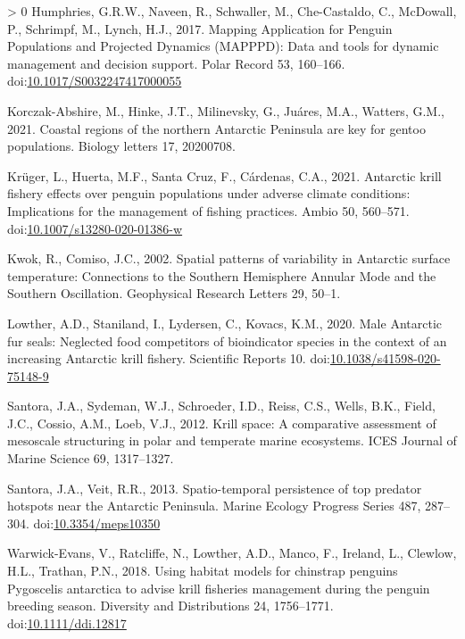 \documentclass[]{elsarticle} %
\newlength{\cslhangindent}
\newenvironment{CSLReferences}[3] %
 {%
  \setlength{\parindent}{0pt}
  \ifodd #1 \everypar{\setlength{\hangindent}{\cslhangindent}}\ignorespaces\fi
  \ifnum #2 > 0
  \setlength{\parskip}{#2\baselineskip}
  \fi
 }%
 {}
\begin{document}
\begin{CSLReferences}{1}{0}
\leavevmode\hypertarget{ref-Humphries2017}{}%
Humphries, G.R.W., Naveen, R., Schwaller, M., Che-Castaldo, C.,
McDowall, P., Schrimpf, M., Lynch, H.J., 2017. Mapping {Application} for
{Penguin Populations} and {Projected Dynamics} ({MAPPPD}): {Data} and
tools for dynamic management and decision support. Polar Record 53,
160--166.
doi:\href{https://doi.org/10.1017/S0032247417000055}{10.1017/S0032247417000055}

\leavevmode\hypertarget{ref-korczak-abshireCoastalRegionsNorthern2021}{}%
Korczak-Abshire, M., Hinke, J.T., Milinevsky, G., Juáres, M.A., Watters,
G.M., 2021. Coastal regions of the northern {Antarctic Peninsula} are
key for gentoo populations. Biology letters 17, 20200708.

\leavevmode\hypertarget{ref-Kruger2021}{}%
Krüger, L., Huerta, M.F., Santa Cruz, F., Cárdenas, C.A., 2021.
Antarctic krill fishery effects over penguin populations under adverse
climate conditions: {Implications} for the management of fishing
practices. Ambio 50, 560--571.
doi:\href{https://doi.org/10.1007/s13280-020-01386-w}{10.1007/s13280-020-01386-w}

\leavevmode\hypertarget{ref-kwokSpatialPatternsVariability2002}{}%
Kwok, R., Comiso, J.C., 2002. Spatial patterns of variability in
{Antarctic} surface temperature: {Connections} to the {Southern
Hemisphere Annular Mode} and the {Southern Oscillation}. Geophysical
Research Letters 29, 50--1.

\leavevmode\hypertarget{ref-Lowther2020}{}%
Lowther, A.D., Staniland, I., Lydersen, C., Kovacs, K.M., 2020. Male
{Antarctic} fur seals: Neglected food competitors of bioindicator
species in the context of an increasing {Antarctic} krill fishery.
Scientific Reports 10.
doi:\href{https://doi.org/10.1038/s41598-020-75148-9}{10.1038/s41598-020-75148-9}

\leavevmode\hypertarget{ref-santoraKrillSpaceComparative2012}{}%
Santora, J.A., Sydeman, W.J., Schroeder, I.D., Reiss, C.S., Wells, B.K.,
Field, J.C., Cossio, A.M., Loeb, V.J., 2012. Krill space: A comparative
assessment of mesoscale structuring in polar and temperate marine
ecosystems. ICES Journal of Marine Science 69, 1317--1327.

\leavevmode\hypertarget{ref-Santora2013}{}%
Santora, J.A., Veit, R.R., 2013. Spatio-temporal persistence of top
predator hotspots near the {Antarctic Peninsula}. Marine Ecology
Progress Series 487, 287--304.
doi:\href{https://doi.org/10.3354/meps10350}{10.3354/meps10350}

\leavevmode\hypertarget{ref-Warwick-Evans2018}{}%
Warwick-Evans, V., Ratcliffe, N., Lowther, A.D., Manco, F., Ireland, L.,
Clewlow, H.L., Trathan, P.N., 2018. Using habitat models for chinstrap
penguins {Pygoscelis} antarctica to advise krill fisheries management
during the penguin breeding season. Diversity and Distributions 24,
1756--1771.
doi:\href{https://doi.org/10.1111/ddi.12817}{10.1111/ddi.12817}


\end{CSLReferences}
\end{document}
